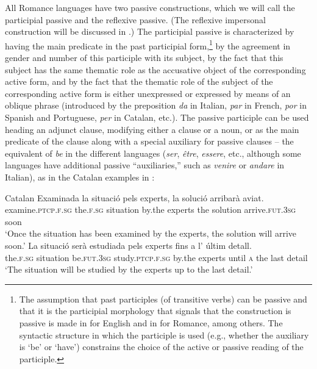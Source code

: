 \documentclass[output=paper,hidelinks]{langscibook}
\begin{document}
All Romance languages have two passive constructions, which we will call the participial passive and the reflexive passive. (The reflexive impersonal construction will be discussed in .) The participial passive is characterized by having the main predicate in the past participial form,\footnote{The assumption that past participles (of transitive verbs) can be passive and that it is the participial morphology that signals that the construction is passive is made in \citet[9--10]{bresnan1982the-passive} for English and in \citet{LoporcaroPesciaRamos2004} for Romance, among others. The syntactic structure in which the participle is used (e.g., whether the auxiliary is `be' or `have') constrains the choice of the active or passive reading of the participle.} by the agreement in gender and number of this participle with its subject, by the fact that this subject has the same thematic role as the accusative object of the corresponding active form, and by the fact that the thematic role of the subject of the corresponding active form is either unexpressed or expressed by means of an oblique phrase (introduced by the preposition \textit{da} in Italian, \textit{par} in French, \textit{por} in Spanish and Portuguese, \textit{per} in Catalan, etc.). The passive participle can be used heading an adjunct clause, modifying either a clause or a noun, or as the main predicate of the clause along with a special auxiliary for passive clauses -- the equivalent of \textit{be} in the different languages (\textit{ser}, \textit{être}, \textit{essere}, etc., although some languages have additional passive ``auxiliaries,'' such as \textit{venire} or \textit{andare} in Italian), as in the Catalan examples in :

\ea\label{ex:Romance:42} Catalan
\ea\label{ex:Romance:42a}
\gll Examinada la situació pels experts, la solució arribarà       aviat.\\
     examine.\textsc{ptcp}.\textsc{f.sg} the.\textsc{f.sg} situation by.the experts the solution arrive.\textsc{fut.3sg} soon\\
\glt `Once the situation has been examined by the experts, the solution will arrive soon.'
\ex\label{ex:Romance:42b}
\gll
 La situació serà estudiada pels experts fins a l' últim detall.\\
     the.\textsc{f.sg} situation be.\textsc{fut.3sg} study.\textsc{ptcp}.\textsc{f.sg} by.the experts until \textsc{a} the last detail\\
     \glt `The situation will be studied by the experts up to the last detail.'
     \z\z
\end{document}
